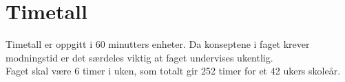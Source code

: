 \section*{Timetall} \label{Sec: Timetall}


	Timetall er oppgitt i 60 minutters enheter. Da konseptene i faget krever modningstid er det særdeles viktig at faget undervises ukentlig.\\
	Faget skal være 6 timer i uken, som totalt gir 252 timer for et 42 ukers skoleår.
